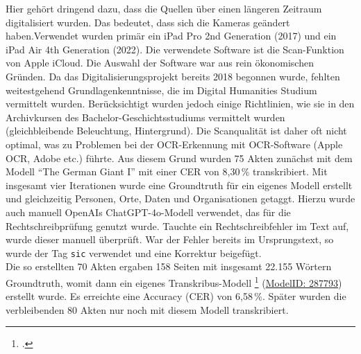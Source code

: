 \documentclass[12pt, a4paper, ngerman, bidi=default]{article}
\let\cite\footcite
\begin{document}
Hier gehört dringend dazu, dass die Quellen über einen längeren Zeitraum digitalisiert wurden. 
Das bedeutet, dass sich die Kameras geändert haben.Verwendet wurden primär ein iPad Pro 2nd Generation (2017) und ein iPad Air 4th Generation (2022). 
Die verwendete Software ist die Scan-Funktion von Apple iCloud. 
Die Auswahl der Software war aus rein ökonomischen Gründen. Da das Digitalisierungsprojekt bereits 2018 begonnen wurde, fehlten weitestgehend Grundlagenkenntnisse, 
die im Digital Humanities Studium vermittelt wurden. Berücksichtigt wurden jedoch einige Richtlinien, wie sie in den Archivkursen des Bachelor-Geschichtsstudiums vermittelt wurden 
(gleichbleibende Beleuchtung, Hintergrund). Die Scanqualität ist daher oft nicht optimal, was zu Problemen bei der OCR-Erkennung mit OCR-Software (Apple OCR, Adobe etc.) führte. 
Aus diesem Grund wurden 75 Akten zunächst mit dem Modell \enquote{The German Giant I} mit einer CER von 8,30\,\% transkribiert. Mit insgesamt vier Iterationen wurde eine Groundtruth 
für ein eigenes Modell erstellt und gleichzeitig Personen, Orte, Daten und Organisationen getaggt. Hierzu wurde auch manuell OpenAIs ChatGPT-4o-Modell verwendet, 
das für die Rechtschreibprüfung genutzt wurde. Tauchte ein Rechtschreibfehler im Text auf, wurde dieser manuell überprüft. War der Fehler bereits im Ursprungstext, 
so wurde der Tag \texttt{sic} verwendet und eine Korrektur beigefügt.\\

Die so erstellten 70 Akten ergaben 158 Seiten mit insgesamt 22.155 Wörtern Groundtruth, womit dann ein eigenes Transkribus-Modell \cite{burkhardt_transkribus_2024}
(\href{https://app.transkribus.org/models/public/287793}{ModelID: 287793}) erstellt wurde. Es erreichte eine Accuracy (CER) von 6,58\,\%. Später wurden die verbleibenden 
80 Akten nur noch mit diesem Modell transkribiert.\\
\end{document}
